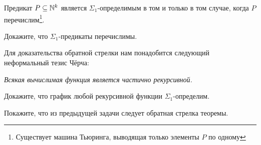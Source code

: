 \documentclass[a4paper, 12pt, num=Г2]{listok}
\begin{document}
\begin{theorem}
	Предикат $P \subseteq \mathbb{N}^k$ является $\Sigma_1$-определимым в том и только в том случае, когда $P$ перечислим\footnote{%
	Существует машина Тьюринга, выводящая только элементы $P$ по одному}.
\end{theorem}
\begin{problem}
	Докажите, что $\Sigma_1$-предикаты перечислимы.
\end{problem}
Для доказательства обратной стрелки нам понадобится следующий неформальный тезис Чёрча:
\begin{center}
	\textit{Всякая вычислимая функция является частично рекурсивной.}
\end{center}
\begin{problem}
	Докажите, что график любой рекурсивной функции $\Sigma_1$-определим.
\end{problem}
\begin{problem}
	Покажите, что из предыдущей задачи следует обратная стрелка теоремы.
\end{problem}
\end{document}
